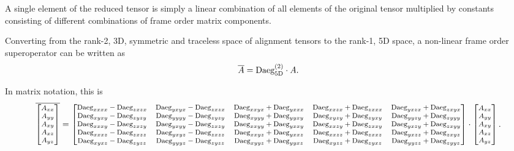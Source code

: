 A single element of the reduced tensor is simply a linear combination of all elements of the original tensor multiplied by constants consisting of different combinations of frame order matrix components.

Converting from the rank-2, 3D, symmetric and traceless space of alignment tensors to the rank-1, 5D space, a non-linear frame order superoperator can be written as
\begin{equation} \label{eq: frame order superoperator}
    \overline A = \textrm{Daeg}^{(2)}_{\textrm{5D}} \cdot A .
\end{equation}

In matrix notation, this is
\begin{equation} \label{eq: frame order superoperator matrix}
\begin{footnotesize}
    \overline{
        \begin{bmatrix}
            A_{xx} \\
            A_{yy} \\
            A_{xy} \\
            A_{xz} \\
            A_{yz}
        \end{bmatrix}
    } =
        \begin{bmatrix}
            \FO_{xxxx} - \FO_{zxzx}  &  \FO_{yxyx} - \FO_{zxzx} &  \FO_{xxyx} + \FO_{yxxx} &  \FO_{xxzx} + \FO_{zxxx} &  \FO_{yxzx} + \FO_{zxyx} \\
            \FO_{xyxy} - \FO_{zyzy}  &  \FO_{yyyy} - \FO_{zyzy} &  \FO_{xyyy} + \FO_{yyxy} &  \FO_{xyzy} + \FO_{zyxy} &  \FO_{yyzy} + \FO_{zyyy} \\
            \FO_{xxxy} - \FO_{zxzy}  &  \FO_{yxyy} - \FO_{zxzy} &  \FO_{xxyy} + \FO_{yxxy} &  \FO_{xxzy} + \FO_{zxxy} &  \FO_{yxzy} + \FO_{zxyy} \\
            \FO_{xxxz} - \FO_{zxzz}  &  \FO_{yxyz} - \FO_{zxzz} &  \FO_{xxyz} + \FO_{yxxz} &  \FO_{xxzz} + \FO_{zxxz} &  \FO_{yxzz} + \FO_{zxyz} \\
            \FO_{xyxz} - \FO_{zyzz}  &  \FO_{yyyz} - \FO_{zyzz} &  \FO_{xyyz} + \FO_{yyxz} &  \FO_{xyzz} + \FO_{zyxz} &  \FO_{yyzz} + \FO_{zyyz}
        \end{bmatrix}
        \cdot
        \begin{bmatrix}
            A_{xx} \\
            A_{yy} \\
            A_{xy} \\
            A_{xz} \\
            A_{yz}
        \end{bmatrix}
    .
\end{footnotesize}
\end{equation}

